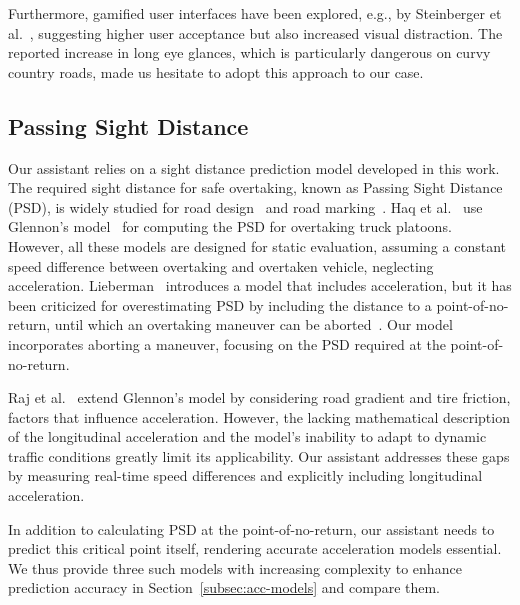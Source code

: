 Furthermore, gamified user interfaces have been explored, e.g., by Steinberger et al.~\cite{Steinberger2016}, suggesting higher user acceptance but also increased visual distraction. 
The reported increase in long eye glances, which is particularly dangerous on curvy country roads, made us hesitate to adopt this approach to our case.













\subsection{Passing Sight Distance }\label{subsec:psd}

Our assistant relies on a sight distance prediction model developed in this work. 
The required sight distance for safe overtaking, known as Passing Sight Distance (PSD), is widely studied for road design~\cite{Glennon1988NEWAI, harwood1989passing} and road marking~\cite{Valkenburg, Saito1984}. 
Haq et al.~\cite{HAQ2022255} use Glennon’s model~\cite{Glennon1988NEWAI} for computing the PSD for overtaking truck platoons.
However, all these models are designed for static evaluation, assuming a constant speed difference between overtaking and overtaken vehicle, neglecting acceleration.
Lieberman~\cite{Lieberman1982} introduces a model that includes acceleration, but it has been criticized for overestimating PSD by including the distance to a point-of-no-return, until which an overtaking maneuver can be aborted~\cite{NCHRP_NAP23278}. 
Our model incorporates aborting a maneuver, focusing on the PSD required at the point-of-no-return.



Raj et al.~\cite{Abhishek2023} extend Glennon’s model by considering road gradient and tire friction, factors that influence acceleration. 
However, the lacking mathematical description of the longitudinal acceleration and the model's inability to adapt to dynamic traffic conditions greatly limit its applicability. 
Our assistant addresses these gaps by measuring real-time speed differences and explicitly including longitudinal acceleration.


In addition to calculating PSD at the point-of-no-return, our assistant needs to predict this critical point itself, rendering accurate acceleration models essential. 
We thus provide three such models with increasing complexity to enhance prediction accuracy in Section~\ref{subsec:acc-models} and compare them.